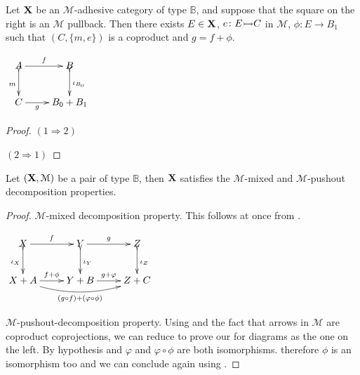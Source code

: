 \documentclass[a4paper,UKenglish,cleveref,pdftex, thm-restate,numberwithinsect,anonymous]{lipics}
\newcommand{\mto}[0]{\scalebox{1}{$\rightarrowtail$}}
\def\X{\textbf {\textup{X}}}
\begin{document}
\noindent
\parbox{10.7cm}{\begin{corollary}\label{cor:po2}
Let $\X$ be an $\mathcal{M}$-adhesive category of type $\mathbb{B}$, and suppose that the square on the right is an $\mathcal{M}$ pullback. Then there exists $E\in \X$, $e\colon E\mto C$ in $\mathcal{M}$, $\phi:E\to B_1$ such that $(C, \{m, e\})$ is a coproduct and $g=f+\phi$. 
\end{corollary}} \parbox{3cm}{\vspace{-.5cm}$\xymatrix{A  \ar[r]^{f} \ar@{>->}[d]_{m}& B \ar@{>->}[d]^{\iota_{B_{0}}}\\ C\ar[r]_-{g} & B_0+B_1}$}

\noindent 
\parbox{9.5cm}{\begin{proof}	$(1\Rightarrow 2)$ 
	
	\smallskip \noindent $(2\Rightarrow 1)$
\end{proof}}

\fi 

\begin{lemma}\label{lem:prop} Let $(\X, \mathcal{M})$ be a pair of type $\mathbb{B}$, then $\X$ satisfies the $\mathcal{M}$-mixed and $\mathcal{M}$-pushout decomposition properties.
\end{lemma}
\begin{proof}$\mathcal{M}$-mixed decomposition property. This follows at once from .
	
	\smallskip \noindent
	\parbox{3cm}{$\xymatrix{X \ar[r]^f \ar@{>->}[d]_{\iota_X}& Y\ar[r]^g \ar@{>->}[d]^{\iota_Y} & Z\ar@{>->}[d]^{\iota_Z}\\X+A  \ar@/_.4cm/[rr]_{(g\circ f) + (\varphi \circ \phi)}\ar[r]^{f+\phi}& Y+B \ar[r]^{g+\varphi}& Z+C}$} \qquad \qquad  \qquad   \qquad \parbox{8cm}{ $\mathcal{M}$-pushout-decomposition property. Using  and the fact that arrows in $\mathcal{M}$ are coproduct coprojections, we can reduce to prove our for diagrams as the one on the left. By hypothesis and  $\varphi$ and $\varphi\circ \phi$ are both isomorphisms. therefore $\phi$ is an isomorphism too and we can conclude again using .\qedhere 
}
	
		
\end{proof}
\end{document}
